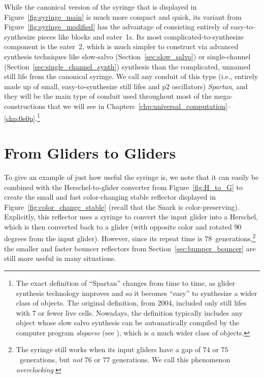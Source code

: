 While the canonical version of the syringe that is displayed in Figure~\ref{fig:syringe_main} is much more compact and quick, its variant from Figure~\ref{fig:syringe_modified} has the advantage of consisting entirely of easy-to-synthesize pieces like blocks and eater~1s. Its most complicated-to-synthesize component is the eater~2, which is much simpler to construct via advanced synthesis techniques like slow-salvo (Section~\ref{sec:slow_salvo}) or single-channel (Section~\ref{sec:single_channel_synth}) synthesis than the complicated, unnamed still life from the canonical syringe. We call any conduit of this type (i.e., entirely made up of small, easy-to-synthesize still lifes and p2 oscillators) \emph{Spartan}, and they will be the main type of conduit used throughout most of the mega-constructions that we will see in Chapters~\ref{chp:universal_computation}--\ref{chp:0e0p}.\footnote{The exact definition of ``Spartan'' changes from time to time, as glider synthesis technology improves and so it becomes ``easy'' to synthesize a wider class of objects. The original definition, from 2004, included only still lifes with $7$ or fewer live cells. Nowadays, the definition typically includes any object whose slow salvo synthesis can be automatically compiled by the computer program \emph{slsparse} (see ), which is a much wider class of objects.}



\section{From Gliders to Gliders}\label{sec:from_gliders_to_gliders}

To give an example of just how useful the syringe is, we note that it can easily be combined with the Herschel-to-glider converter from Figure~\ref{fig:H_to_G} to create the small and fast color-changing stable reflector displayed in Figure~\ref{fig:color_change_stable} (recall that the Snark is color-preserving). Explicitly, this reflector uses a syringe to convert the input glider into a Herschel, which is then converted back to a glider (with opposite color and rotated $90$ degrees from the input glider). However, since its repeat time is $78$~generations,\footnote{The syringe still works when its input gliders have a gap of $74$ or $75$~generations, but \emph{not} $76$ or $77$ generations. We call this phenomenon \emph{overclocking}.} the smaller and faster bouncer reflectors from Section~\ref{sec:bumper_bouncer} are still more useful in many situations.

